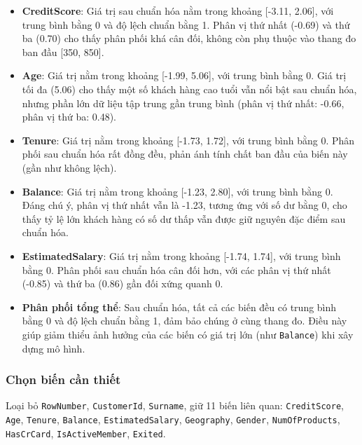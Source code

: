 \documentclass[
]{article}
\providecommand{\tightlist}{%
  \setlength{\itemsep}{0pt}\setlength{\parskip}{0pt}}
\begin{document}
\begin{itemize}
  \begin{itemize}
  \tightlist
  \item
    \textbf{CreditScore}: Giá trị sau chuẩn hóa nằm trong khoảng
    {[}-3.11, 2.06{]}, với trung bình bằng 0 và độ lệch chuẩn bằng 1.
    Phân vị thứ nhất (-0.69) và thứ ba (0.70) cho thấy phân phối khá cân
    đối, không còn phụ thuộc vào thang đo ban đầu {[}350, 850{]}.
  \item
    \textbf{Age}: Giá trị nằm trong khoảng {[}-1.99, 5.06{]}, với trung
    bình bằng 0. Giá trị tối đa (5.06) cho thấy một số khách hàng cao
    tuổi vẫn nổi bật sau chuẩn hóa, nhưng phần lớn dữ liệu tập trung gần
    trung bình (phân vị thứ nhất: -0.66, phân vị thứ ba: 0.48).
  \item
    \textbf{Tenure}: Giá trị nằm trong khoảng {[}-1.73, 1.72{]}, với
    trung bình bằng 0. Phân phối sau chuẩn hóa rất đồng đều, phản ánh
    tính chất ban đầu của biến này (gần như không lệch).
  \item
    \textbf{Balance}: Giá trị nằm trong khoảng {[}-1.23, 2.80{]}, với
    trung bình bằng 0. Đáng chú ý, phân vị thứ nhất vẫn là -1.23, tương
    ứng với số dư bằng 0, cho thấy tỷ lệ lớn khách hàng có số dư thấp
    vẫn được giữ nguyên đặc điểm sau chuẩn hóa.
  \item
    \textbf{EstimatedSalary}: Giá trị nằm trong khoảng {[}-1.74,
    1.74{]}, với trung bình bằng 0. Phân phối sau chuẩn hóa cân đối hơn,
    với các phân vị thứ nhất (-0.85) và thứ ba (0.86) gần đối xứng quanh
    0.
  \item
    \textbf{Phân phối tổng thể}: Sau chuẩn hóa, tất cả các biến đều có
    trung bình bằng 0 và độ lệch chuẩn bằng 1, đảm bảo chúng ở cùng
    thang đo. Điều này giúp giảm thiểu ảnh hưởng của các biến có giá trị
    lớn (như \texttt{Balance}) khi xây dựng mô hình.
  \end{itemize}
\end{itemize}

\subsubsection{Chọn biến cần thiết}\label{sec-feature-selection}

Loại bỏ \texttt{RowNumber}, \texttt{CustomerId}, \texttt{Surname}, giữ
11 biến liên quan: \texttt{CreditScore}, \texttt{Age}, \texttt{Tenure},
\texttt{Balance}, \texttt{EstimatedSalary}, \texttt{Geography},
\texttt{Gender}, \texttt{NumOfProducts}, \texttt{HasCrCard},
\texttt{IsActiveMember}, \texttt{Exited}.
\end{document}
